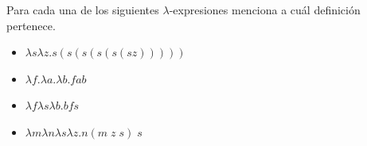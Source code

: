 		\begin{exercise}
			Para cada una de los siguientes $\lambda$-expresiones menciona a cuál definición pertenece. \\
			\begin{itemize}
				\item $\lambda s\lambda z.s(s(s(s(s(sz)))))$
				\item $\lambda f.\lambda a.\lambda b.fab $
				\item $\lambda f\lambda s\lambda b. bfs$
				\item $\lambda m\lambda n\lambda s\lambda z.n(m \; z \; s) \; s$
			\end{itemize}
		\end{exercise}

                    
            
